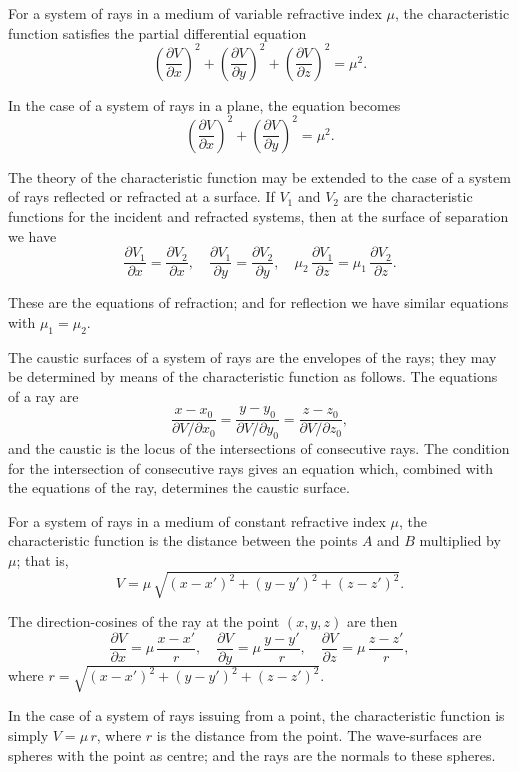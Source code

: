 \documentclass[12pt,a4paper]{article}
\theoremstyle{plain}
\begin{document}
For a system of rays in a medium of variable refractive index $\mu$, the characteristic function satisfies the partial differential equation
\[
\left(\frac{\partial V}{\partial x}\right)^{2} + \left(\frac{\partial V}{\partial y}\right)^{2} + \left(\frac{\partial V}{\partial z}\right)^{2} = \mu^{2}.
\]

In the case of a system of rays in a plane, the equation becomes
\[
\left(\frac{\partial V}{\partial x}\right)^{2} + \left(\frac{\partial V}{\partial y}\right)^{2} = \mu^{2}.
\]

\medskip\noindent
The theory of the characteristic function may be extended to the case of a system of rays reflected or refracted at a surface. If $V_{1}$ and $V_{2}$ are the characteristic functions for the incident and refracted systems, then at the surface of separation we have
\[
\frac{\partial V_{1}}{\partial x} = \frac{\partial V_{2}}{\partial x}, \quad
\frac{\partial V_{1}}{\partial y} = \frac{\partial V_{2}}{\partial y}, \quad
\mu_{2}\,\frac{\partial V_{1}}{\partial z} = \mu_{1}\,\frac{\partial V_{2}}{\partial z}.
\]

These are the equations of refraction; and for reflection we have similar equations with $\mu_{1} = \mu_{2}$.

\medskip\noindent
The caustic surfaces of a system of rays are the envelopes of the rays; they may be determined by means of the characteristic function as follows. The equations of a ray are
\[
\frac{x - x_{0}}{\partial V/\partial x_{0}} = \frac{y - y_{0}}{\partial V/\partial y_{0}} = \frac{z - z_{0}}{\partial V/\partial z_{0}},
\]
and the caustic is the locus of the intersections of consecutive rays. The condition for the intersection of consecutive rays gives an equation which, combined with the equations of the ray, determines the caustic surface.

\medskip\noindent
For a system of rays in a medium of constant refractive index $\mu$, the characteristic function is the distance between the points $A$ and $B$ multiplied by $\mu$; that is,
\[
V = \mu\,\sqrt{(x - x')^{2} + (y - y')^{2} + (z - z')^{2}}.
\]

The direction-cosines of the ray at the point $(x, y, z)$ are then
\[
\frac{\partial V}{\partial x} = \mu\,\frac{x - x'}{r}, \quad
\frac{\partial V}{\partial y} = \mu\,\frac{y - y'}{r}, \quad
\frac{\partial V}{\partial z} = \mu\,\frac{z - z'}{r},
\]
where $r = \sqrt{(x - x')^{2} + (y - y')^{2} + (z - z')^{2}}$.

\medskip\noindent
In the case of a system of rays issuing from a point, the characteristic function is simply $V = \mu\,r$, where $r$ is the distance from the point. The wave-surfaces are spheres with the point as centre; and the rays are the normals to these spheres.
\end{document}
